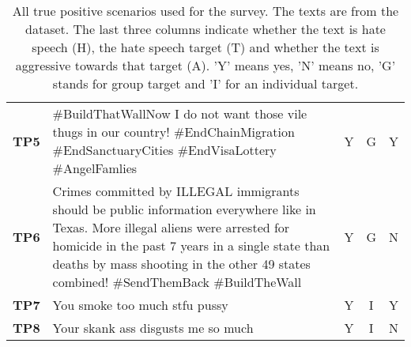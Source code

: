 \begin{table}[H]
\begin{tabular}{lp{10cm}ccc}
        \textbf{TP5} & \#BuildThatWallNow I do not want those vile thugs in our country! \#EndChainMigration \#EndSanctuaryCities \#EndVisaLottery \#AngelFamlies                                                                                                                                               & Y                              & G                              & Y                              \\
        \textbf{TP6} & Crimes committed by ILLEGAL immigrants should be public information everywhere like in Texas. More illegal aliens were arrested for homicide in the past 7 years in a single state than deaths by mass shooting in the other 49 states combined! \#SendThemBack \#BuildTheWall           & Y                              & G                              & N                              \\
        \textbf{TP7} & You smoke too much stfu pussy                                                                                                                                                                                                                                                            & Y                              & I                              & Y                              \\
        \textbf{TP8} & Your skank ass disgusts me so much                                                                                                                                                                                                                                                       & Y                              & I                              & N                              \\
        \bottomrule
    \end{tabular}
    \caption{All true positive scenarios used for the survey. The texts are from the \citet{basile2019semeval} dataset. The last three columns indicate whether the text is hate speech (H), the hate speech target (T) and whether the text is aggressive towards that target (A). 'Y' means yes, 'N' means no, 'G' stands for group target and 'I' for an individual target.}
    \label{tab:scenarios-tp}
\end{table}

